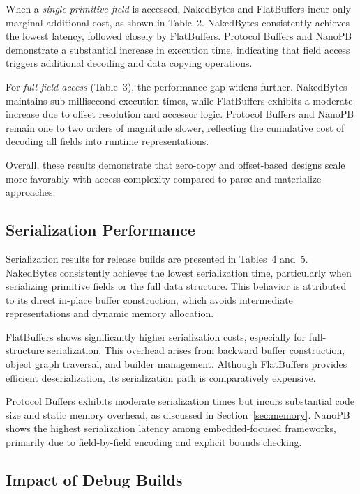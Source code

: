 \documentclass[11pt, a4paper]{article}
\begin{document}
When a \textit{single primitive field} is accessed, NakedBytes and FlatBuffers incur only marginal additional cost, as shown in Table~2. NakedBytes consistently achieves the lowest latency, followed closely by FlatBuffers. Protocol Buffers and NanoPB demonstrate a substantial increase in execution time, indicating that field access triggers additional decoding and data copying operations.

For \textit{full-field access} (Table~3), the performance gap widens further. NakedBytes maintains sub-millisecond execution times, while FlatBuffers exhibits a moderate increase due to offset resolution and accessor logic. Protocol Buffers and NanoPB remain one to two orders of magnitude slower, reflecting the cumulative cost of decoding all fields into runtime representations.

Overall, these results demonstrate that zero-copy and offset-based designs scale more favorably with access complexity compared to parse-and-materialize approaches.

\subsection{Serialization Performance}

Serialization results for release builds are presented in Tables~4 and~5. NakedBytes consistently achieves the lowest serialization time, particularly when serializing primitive fields or the full data structure. This behavior is attributed to its direct in-place buffer construction, which avoids intermediate representations and dynamic memory allocation.

FlatBuffers shows significantly higher serialization costs, especially for full-structure serialization. This overhead arises from backward buffer construction, object graph traversal, and builder management. Although FlatBuffers provides efficient deserialization, its serialization path is comparatively expensive.

Protocol Buffers exhibits moderate serialization times but incurs substantial code size and static memory overhead, as discussed in Section~\ref{sec:memory}. NanoPB shows the highest serialization latency among embedded-focused frameworks, primarily due to field-by-field encoding and explicit bounds checking.

\subsection{Impact of Debug Builds}
\end{document}
